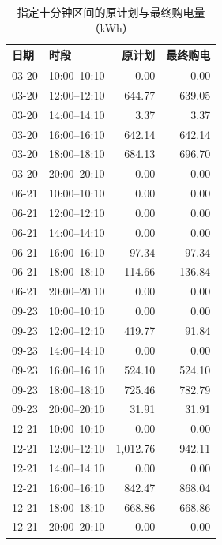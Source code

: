 \begin{table}[htbp]
\centering\small
\caption{指定十分钟区间的原计划与最终购电量（kWh）}\label{tab:q3-slots}
\begin{tabular}{llrr}
\toprule
日期 & 时段 & 原计划 & 最终购电\\
\midrule
03-20 & 10:00--10:10 & 0.00 & 0.00\\
03-20 & 12:00--12:10 & 644.77 & 639.05\\
03-20 & 14:00--14:10 & 3.37 & 3.37\\
03-20 & 16:00--16:10 & 642.14 & 642.14\\
03-20 & 18:00--18:10 & 684.13 & 696.70\\
03-20 & 20:00--20:10 & 0.00 & 0.00\\
06-21 & 10:00--10:10 & 0.00 & 0.00\\
06-21 & 12:00--12:10 & 0.00 & 0.00\\
06-21 & 14:00--14:10 & 0.00 & 0.00\\
06-21 & 16:00--16:10 & 97.34 & 97.34\\
06-21 & 18:00--18:10 & 114.66 & 136.84\\
06-21 & 20:00--20:10 & 0.00 & 0.00\\
09-23 & 10:00--10:10 & 0.00 & 0.00\\
09-23 & 12:00--12:10 & 419.77 & 91.84\\
09-23 & 14:00--14:10 & 0.00 & 0.00\\
09-23 & 16:00--16:10 & 524.10 & 524.10\\
09-23 & 18:00--18:10 & 725.46 & 782.79\\
09-23 & 20:00--20:10 & 31.91 & 31.91\\
12-21 & 10:00--10:10 & 0.00 & 0.00\\
12-21 & 12:00--12:10 & 1,012.76 & 942.11\\
12-21 & 14:00--14:10 & 0.00 & 0.00\\
12-21 & 16:00--16:10 & 842.47 & 868.04\\
12-21 & 18:00--18:10 & 668.86 & 668.86\\
12-21 & 20:00--20:10 & 0.00 & 0.00\\
\bottomrule
\end{tabular}
\end{table}

